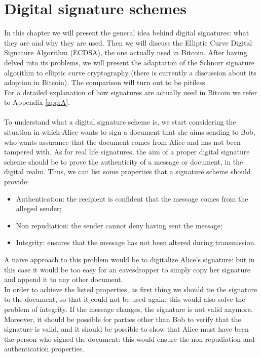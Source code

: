 \chapter{Digital signature schemes}
\label{chpr:dss}

In this chapter we will present the general idea behind digital signatures: what they are and why they are used. Then we will discuss the Elliptic Curve Digital Signature Algorithm (ECDSA), the one actually used in Bitcoin. After having delved into its problems, we will present the adaptation of the Schnorr signature algorithm to elliptic curve cryptography (there is currently a discussion about its adoption in Bitcoin). The comparison will turn out to be pitiless.
\\
For a detailed explanation of how signatures are actually used in Bitcoin we refer to Appendix \ref{app:A}.
\\
\\
To understand what a digital signature scheme is, we start considering the situation in which Alice wants to sign a document that she aims sending to Bob, who wants assurance that the document comes from Alice and has not been tampered with. As for real life signatures, the aim of a proper digital signature scheme should be to prove the authenticity of a message or document, in the digital realm. Thus, we can list some properties that a signature scheme should provide:
\begin{itemize}
	\item Authentication: the recipient is confident that the message comes from the alleged sender;
	\item Non repudiation: the sender cannot deny having sent the message;
	\item Integrity: ensures that the message has not been altered during transmission.
\end{itemize}
A naive approach to this problem would be to digitalize Alice's signature: but in this case it would be too easy for an eavesdropper to simply copy her signature and append it to any other document. 
\\
In order to achieve the listed properties, as first thing we should tie the signature to the document, so that it could not be used again: this would also solve the problem of integrity. If the message changes, the signature is not valid anymore.  Moreover, it should be possible for parties other than Bob to verify that the signature is valid, and it should be possible to show that Alice must have been the person who signed the document: this would ensure the non repudiation and authentication properties. 
